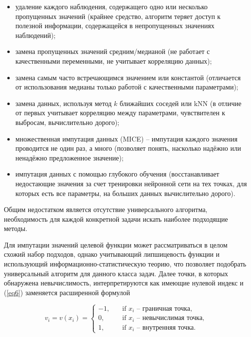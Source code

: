 \documentclass[10pt,a4paper]{book}
\begin{document}
\begin{itemize}[itemsep=0pt,parsep=2pt,topsep=2pt,partopsep=0pt]
\item{удаление каждого наблюдения, содержащего одно или несколько пропущенных значений (крайнее средство, алгоритм теряет доступ к полезной информации, содержащейся в непропущенных значениях наблюдений);}
\item{замена пропущенных значений средним/медианой (не работает с качественными переменными, не учитывает корреляцию данных);}
\item{замена самым часто встречающимся значением или константой (отличается от использования медианы только работой с качественными параметрами);}
\item{замена данных, используя метод $k$ ближайших соседей или kNN (в отличие от первых учитывает корреляцию между параметрами, чувствителен к выбросам, вычислительно дорого);}
\item{множественная импутация данных (MICE) – импутация каждого значения проводится не один раз, а много (позволяет понять, насколько надёжно или ненадёжно предложенное значение);}
\item{импутация данных с помощью глубокого обучения (восстанавливает недостающие значения за счет тренировки нейронной сети на тех точках, для которых есть все параметры, на больших данных вычислительно дорого).}
\end{itemize}
Общим недостатком является отсутствие универсального алгоритма, необходимость для каждой конкретной задачи искать наиболее подходящие методы.

Для импутации значений целевой функции может рассматриваться в целом схожий набор подходов, однако учитывающий липшицевость функции и использующий информационно-статистическую теорию, что позволяет подобрать универсальный алгоритм для данного класса задач. Далее точки, в которых обнаружена невычислимость, интерпретируются как имеющие нулевой индекс и (\ref{eq6}) заменяется расширенной формулой

\begin{equation}\label{eq12} 
v_i=v(x_i)=
  \begin{cases}
    -1, & {\quad \text{if } x_i \text{ -- граничная точка}},\\
    0, & {\quad \text{if } x_i \text{ -- невычислимая точка}},\\
    1, & {\quad \text{if } x_i \text{ -- внутренняя точка}}.
  \end{cases}
\end{equation}
\end{document}
